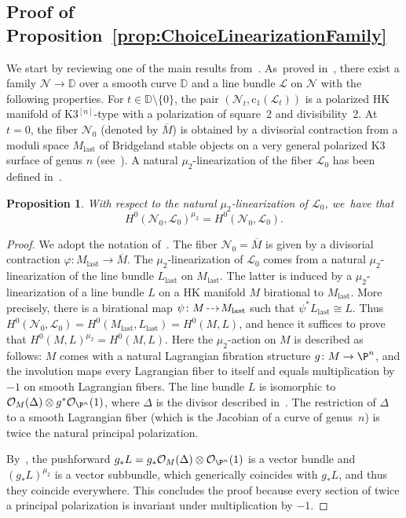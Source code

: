 \documentclass[JEP,XML,SOM,Unicode,published]{cedram}
\newcommand{\HK}{\textup{HK}\xspace}
\newcommand{\dradpl}{{\hspace*{-2.5mm}\begin{tikzcd}[ampersand replacement=\&,column sep = scriptsize]\mbox{}\ar[r,dashed]\&\mbox{}\end{tikzcd}\hspace*{-2.5mm}}}
\newcommand{\dratst}{{\hspace*{-2.5mm}\begin{tikzcd}[ampersand replacement=\&,column sep = small]\mbox{}\ar[r,dashed]\&\mbox{}\end{tikzcd}\hspace*{-2.5mm}}}
\let\drascst\dratst
\newcommand{\dra}{\mathchoice{\dradpl}{\dratst}{\drascst}{\drascst}}
\newcommand{\DD}{{\mathbb D}}
\newcommand\cL{\mathcal{L}}
\newcommand\cN{\mathcal{N}}
\newcommand\cO{\mathcal{O}}
\let\phi\varphi
\newtheorem{prop}[lemm]{Proposition}
\theoremstyle{definition}
\begin{document}
\subsection{Proof of Proposition~\ref{prop:ChoiceLinearizationFamily}}\label{subsec:LinearizationLagrangian}

We start by reviewing one of the main results from~\cite{involutions1}. As~proved in~\cite[\S 5.3]{involutions1}, there exist a family $\cN\to\DD$ over a smooth curve $\DD$ and a line bundle $\mathcal{L}$ on $\cN$ with the following properties.
For $t\in\DD\setminus\{0\}$, the pair $(\cN_t,\mathrm{c}_1(\cL_t))$ is a polarized \HK manifold of K3$^{[n]}$-type with a polarization of square~2 and divisibility~2.
At $t=0$, the fiber $\cN_0$ (denoted by $\overline{M}$) is obtained by a divisorial contraction from a moduli space $M_{\mathrm{last}}$ of Bridgeland stable objects on a very general polarized K3 surface of genus $n$ (see~\cite[Lem.\,3.22]{involutions1}).
A natural $\mu_2$-linearization of the fiber $\cL_0$ has been defined in~\cite[Prop.\,5.13]{involutions1}.

\begin{prop}\label{prop:H0Invariant}
With respect to the natural $\mu_2$-linearization of $\cL_0$, we~have that
\[
H^0(\cN_0,\cL_0)^{\mu_2} = H^0(\cN_0,\cL_0).
\]
\end{prop}

\begin{proof}
We adopt the notation of~\cite{involutions1}. The fiber $\cN_0=\overline{M}$ is given by a divisorial contraction $\phi\colon M_{\mathrm{last}}\to \overline{M}$.
The $\mu_2$-linearization of $\cL_0$ comes from a natural $\mu_2$-linearization of the line bundle $L_{\mathrm{last}}$ on $M_{\mathrm{last}}$. The latter
is induced by a $\mu_2$-linearization of a line bundle $L$ on
a \HK manifold $M$ birational to $M_{\mathrm{last}}$. More precisely, there is a birational map $\psi\colon M\dra M_{\mathrm{last}}$ such that $\psi^{*}L_{\mathrm{last}}\cong L$. Thus
$H^0(\cN_0,\cL_0)=H^0(M_{\mathrm{last}},L_{\mathrm{last}})=H^0(M,L)$, and hence it suffices to prove that
$H^0(M,L)^{\mu_2} =H^0(M,L)$. Here the $\mu_2$-action on $M$ is described as follows: $M$ comes with a natural Lagrangian fibration structure $g\colon M\to \P^n$, and the involution maps every Lagrangian fiber to itself and equals multiplication by $-1$ on smooth Lagrangian fibers.
The line bundle $L$ is isomorphic to $\cO_{M}(\Delta)\otimes g^*\cO_{\P^n}(1)$, where $\Delta$ is the divisor described in~\cite[Prop.\,3.4]{involutions1}.
The restriction of $\Delta$ to a smooth Lagrangian fiber (which is the Jacobian of a curve of genus~$n$) is twice the natural
principal polarization.

By~\cite[Th.\,10.32]{Kollar:SingularitiesMMP}, the pushforward $g_* L=g_*\cO_M(\Delta)\otimes\cO_{\P^n}(1)$ is a vector bundle and $(g_* L)^{\mu_2}$ is a vector subbundle, which generically coincides with $g_* L$, and thus they coincide everywhere.
This concludes the proof because every section of twice a
principal polarization is invariant under multiplication by $-1$.
\end{proof}
\end{document}
